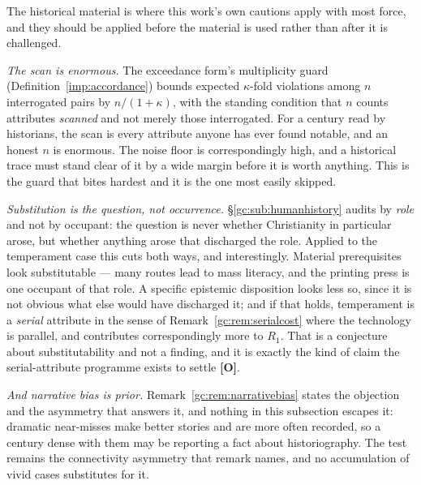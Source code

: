 \begin{remark}
\label{gc:rem:historyguards}
The historical material is where this work's own cautions apply with
most force, and they should be applied before the material is used
rather than after it is challenged.

\emph{The scan is enormous.} The exceedance form's multiplicity
guard (Definition~\ref{imp:accordance}) bounds expected $\kappa$-fold violations among $n$ interrogated
pairs by $n/(1+\kappa)$, with the standing condition that $n$ counts
attributes \emph{scanned} and not merely those interrogated. For a
century read by historians, the scan is every attribute anyone has ever
found notable, and an honest $n$ is enormous. The noise floor is
correspondingly high, and a historical trace must stand clear of it by a
wide margin before it is worth anything. This is the guard that bites
hardest and it is the one most easily skipped.

\emph{Substitution is the question, not occurrence.}
\S\ref{gc:sub:humanhistory} audits by \emph{role} and not by occupant:
the question is never whether Christianity in particular arose, but
whether anything arose that discharged the role. Applied to the
temperament case this cuts both ways, and interestingly. Material
prerequisites look substitutable --- many routes lead to mass literacy,
and the printing press is one occupant of that role. A specific epistemic
disposition looks less so, since it is not obvious what else would have
discharged it; and if that holds, temperament is a \emph{serial}
attribute in the sense of Remark~\ref{gc:rem:serialcost} where the technology
is parallel, and contributes correspondingly more to $R_1$. That is a
conjecture about substitutability and not a finding, and it is exactly
the kind of claim the serial-attribute programme exists to settle
\textbf{[O]}.

\emph{And narrative bias is prior.} Remark~\ref{gc:rem:narrativebias}
states the objection and the asymmetry that answers it, and nothing in
this subsection escapes it: dramatic near-misses make better stories and
are more often recorded, so a century dense with them may be reporting a
fact about historiography. The test remains the connectivity asymmetry
that remark names, and no accumulation of vivid cases substitutes for it.
\end{remark}



